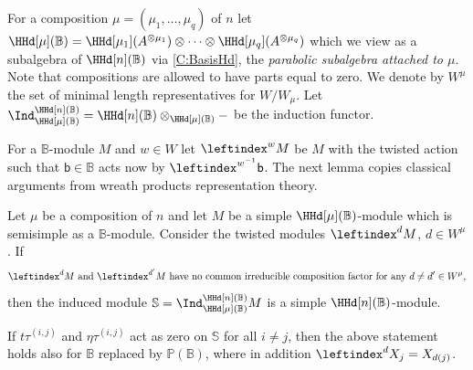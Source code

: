 \documentclass[a4paper,11pt]{amsart}
\numberwithin{equation}{subsection}
\theoremstyle{definition}
\theoremstyle{theorem}
\theoremstyle{remark}
\newcommand\Sym{W}
\newcommand\bb{\mathsf{b}}
\newcommand\Po{\mathbb{P}(\mathbb{B})}
\newcommand{\Bo}{\mathbb{B}}
\newcommand{\So}{\mathbb{S}}
\begin{document}
\begin{Definition}
For a composition $\mu=(\mu_1,\dots,\mu_q)$ of $n$ let
$\HHd[\mu](\Bo)=\HHd[\mu_1](A^{\otimes\mu_1})\otimes\cdots\otimes
\HHd[\mu_q](A^{\otimes\mu_q})$ which we view as a subalgebra of $\HHd[n](\Bo)$ via \autoref{C:BasisHd}, the  \emph{parabolic subalgebra attached to $\mu$}. Note that compositions are allowed to have parts equal to zero.
We denote by  $\Sym^{\mu}$ the set of minimal length
representatives for $\Sym/\Sym_{\mu}$. Let $\Ind_{\HHd[\mu](\Bo)}^{\HHd[n](\Bo)}=\HHd[n](\Bo)\otimes_{{\HHd[ \mu](\Bo)}}-$ be the induction functor.
\end{Definition}


\noindent For a $\Bo$-module $M$ and $w\in\Sym$  let $\leftindex^{w}M$ be  $M$ with the twisted action such that
  $\bb\in\Bo$ acts now by $\leftindex^{w^{-1}}\bb$.
The next lemma copies classical arguments from wreath products representation theory.

\begin{Lemma}\label{L:induction}
  Let $\mu$ be a composition of $n$ and let $M$ be a simple
  $\HHd[\mu](\Bo)$-module which is semisimple as a $\Bo$-module.
Consider the twisted modules $\leftindex^{d}M$,  $d\in\Sym^{\mu}$.  If
\begin{equation}\label{E:separate}
\text{$\leftindex^{d}M$ and $\leftindex^{d'}M$ have no  common irreducible composition factor for any $d\ne d'\in\Sym^{\mu}$,}
\end{equation}
then the induced module $\So=\Ind_{\HHd[\mu](\Bo)}^{\HHd[n](\Bo)}M$  is a simple $\HHd[n](\Bo)$-module.

If $t\tau^{(i,j)}$ and $\eta\tau^{(i,j)}$ act as
  zero on $\So$ for all $i\ne j$, then the above statement holds also for
 $\Bo$ replaced by $\Po$, where in addition
  $\leftindex^{d}X_j=X_{d(j)}$.
\end{Lemma}
\end{document}
